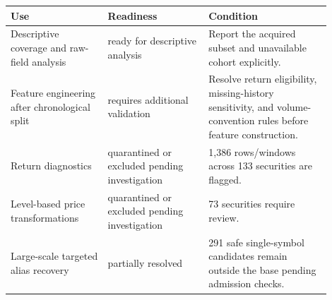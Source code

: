 \begin{tabular}{@{}p{0.27\linewidth}p{0.29\linewidth}p{0.34\linewidth}@{}}
\toprule
Use & Readiness & Condition \\
\midrule
Descriptive coverage and raw-field analysis & ready for descriptive analysis & Report the acquired subset and unavailable cohort explicitly. \\
Feature engineering after chronological split & requires additional validation & Resolve return eligibility, missing-history sensitivity, and volume-convention rules before feature construction. \\
Return diagnostics & quarantined or excluded pending investigation & 1,386 rows/windows across 133 securities are flagged. \\
Level-based price transformations & quarantined or excluded pending investigation & 73 securities require review. \\
Large-scale targeted alias recovery & partially resolved & 291 safe single-symbol candidates remain outside the base pending admission checks. \\
\bottomrule
\end{tabular}
